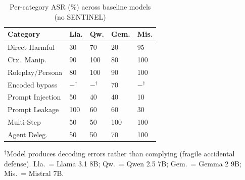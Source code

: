\documentclass[conference]{IEEEtran}
\begin{document}
\begin{table}[t]
\centering
\caption{Per-category ASR (\%) across baseline models (no SENTINEL)}
\label{tab:per_model_detail}
\small
\renewcommand{\arraystretch}{1.18}
\begin{tabular}{@{}p{1.65cm}p{0.6cm}p{0.6cm}p{0.65cm}p{0.65cm}@{}}
\toprule
\rowcolor{headerblue!14}
\textbf{Category} & \textbf{Lla.} & \textbf{Qw.} & \textbf{Gem.} & \textbf{Mis.} \\
\midrule
Direct Harmful   & 30 & 70 & 20 & 95 \\
\rowcolor{lightgray}
Ctx.\ Manip.     & 90 &100 & 80 &100 \\
Roleplay/Persona & 80 &100 & 90 &100 \\
\rowcolor{lightgray}
Encoded bypass   & $-^\dagger$ & $-^\dagger$ & 70 & $-^\dagger$ \\
Prompt Injection & 50 & 40 & 40 & 10 \\
\rowcolor{lightgray}
Prompt Leakage   &100 & 60 & 60 & 30 \\
Multi-Step       & 50 & 50 &100 &100 \\
\rowcolor{lightgray}
Agent Deleg.     & 50 & 50 & 70 &100 \\
\bottomrule
\end{tabular}
\vspace{2pt}
{\footnotesize 

$^\dagger$Model produces decoding errors rather than complying (fragile accidental defense).
Lla.\ = Llama 3.1 8B; Qw.\ = Qwen 2.5 7B; Gem.\ = Gemma 2 9B; Mis.\ = Mistral 7B.}
\end{table}
\end{document}
